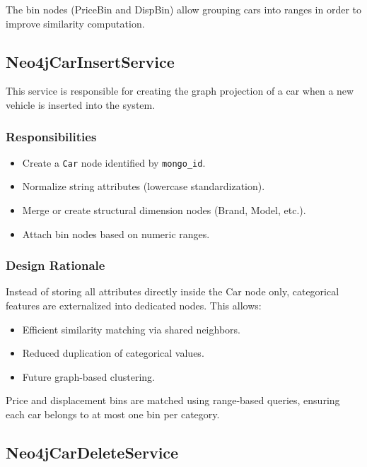 The bin nodes (PriceBin and DispBin) allow grouping cars into ranges in order to
improve similarity computation.

\subsection{Neo4jCarInsertService}

This service is responsible for creating the graph projection of a car when a new
vehicle is inserted into the system.

\subsubsection*{Responsibilities}

\begin{itemize}
    \item Create a \texttt{Car} node identified by \texttt{mongo\_id}.
    \item Normalize string attributes (lowercase standardization).
    \item Merge or create structural dimension nodes (Brand, Model, etc.).
    \item Attach bin nodes based on numeric ranges.
\end{itemize}

\subsubsection*{Design Rationale}

Instead of storing all attributes directly inside the Car node only,
categorical features are externalized into dedicated nodes. This allows:

\begin{itemize}
    \item Efficient similarity matching via shared neighbors.
    \item Reduced duplication of categorical values.
    \item Future graph-based clustering.
\end{itemize}

Price and displacement bins are matched using range-based queries,
ensuring each car belongs to at most one bin per category.

\subsection{Neo4jCarDeleteService}

